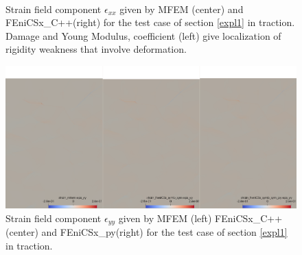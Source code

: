 \documentclass[12pt]{article}
\newcommand{\f}[1]{FEniCSx#1}
\newcommand{\tens}[1]{
	{\ensuremath{\mathsf{#1}}}
}
\begin{document}
\begin{figure}
	\\
	\caption{Strain  field component $\tens{\epsilon}_{xx}$ given by MFEM (center)  and \f{\_C++}(right) for the test case of section \ref{expl1} in traction. Damage and Young Modulus, coefficient (left) give  localization of rigidity weakness that involve deformation. \label{strainxx_comp}}
\end{figure}
\begin{figure}	
	\includegraphics[width=1.\textwidth]{strainyy_up.png}
	\caption{Strain  field component $\tens{\epsilon}_{yy}$ given by MFEM (left) \f{\_C++}(center) and \f{\_py}(right) for the test case of section \ref{expl1} in traction.\label{strainyy}}
\end{figure}
\end{document}
